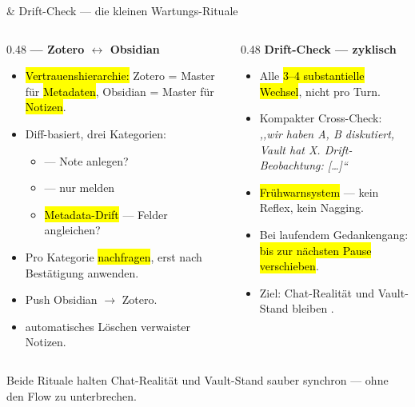 \documentclass[aspectratio=169,11pt]{beamer}
\begin{document}
\begin{frame}{ \& Drift-Check --- die kleinen Wartungs-Rituale}
\begin{columns}[T,onlytextwidth]

\begin{column}{0.48\textwidth}
\textbf{ --- Zotero $\leftrightarrow$ Obsidian}
\begin{itemize}\scriptsize
  \item \hl{Vertrauenshierarchie:} Zotero = Master für \hl{Metadaten}, Obsidian = Master für \hl{Notizen}.
  \item Diff-basiert, drei Kategorien:
  \begin{itemize}\scriptsize
    \item {} --- Note anlegen?
    \item {} --- nur melden
    \item \hl{Metadata-Drift} --- Felder angleichen?
  \end{itemize}
  \item Pro Kategorie \hl{nachfragen}, erst nach Bestätigung anwenden.
  \item {} Push Obsidian $\rightarrow$ Zotero.
  \item {} automatisches Löschen verwaister Notizen.
\end{itemize}
\end{column}

\begin{column}{0.48\textwidth}
\textbf{Drift-Check --- zyklisch}
\begin{itemize}\scriptsize
  \item Alle \hl{3--4 substantielle Wechsel}, nicht pro Turn.
  \item Kompakter Cross-Check:\\
        \emph{,,wir haben A, B diskutiert, Vault hat X. Drift-Beobachtung: [\ldots]``}
  \item \hl{Frühwarnsystem} --- kein Reflex, kein Nagging.
  \item Bei laufendem Gedankengang: \hl{bis zur nächsten Pause verschieben}.
  \item Ziel: Chat-Realität und Vault-Stand bleiben .
\end{itemize}
\end{column}

\end{columns}

\vspace{0.4em}
\begin{takeaway}[Kernidee]
Beide Rituale halten Chat-Realität und Vault-Stand sauber synchron --- ohne den Flow zu unterbrechen.
\end{takeaway}
\end{frame}
\end{document}
